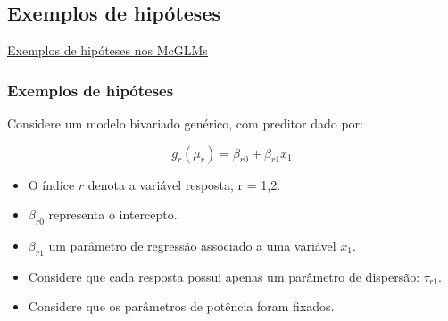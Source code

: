 \documentclass[10pt,
  aspectratio=169,
  serif,
  mathserif,
  professionalfont,
  compress,
  handout,
  ]{beamer}\usepackage[]{graphicx}\usepackage[]{color}
\begin{document}

\subsection{Exemplos de hipóteses}


\begin{frame}[c, allowframebreaks]

\begin{center}

  {\normalsize \href{https://lineu96.github.io/st/}{Exemplos de hipóteses nos McGLMs}}
  
\end{center}

\end{frame}


\begin{frame}

\frametitle{Exemplos de hipóteses}

Considere um modelo bivariado genérico, com preditor dado por:

$$g_r(\mu_r) = \beta_{r0} + \beta_{r1} x_1$$

\begin{itemize}
  
  \item O índice $r$ denota a variável resposta, r = 1,2.
  
  \item $\beta_{r0}$ representa o intercepto.
  
  \item $\beta_{r1}$ um parâmetro de regressão associado a uma variável $x_1$.
  
  \item Considere que cada resposta possui apenas um parâmetro de dispersão: $\tau_{r1}$.
  
  \item Considere que os parâmetros de potência foram fixados.
  
\end{itemize}

\end{frame}

\end{document}
